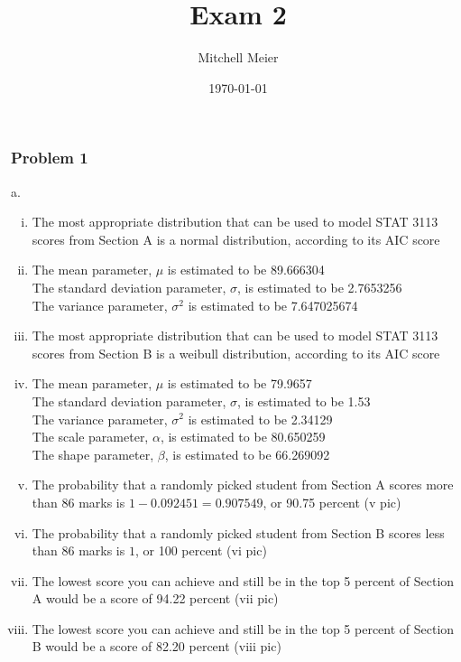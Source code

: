 \documentclass[14pt]{article}
\title{Exam 2}
\author{Mitchell Meier}
\date{\today}
\begin{document}
\maketitle

\subsubsection*{Problem 1}

a.
\begin{enumerate}[(i)]

\item
The most appropriate distribution that can be used to model STAT 3113 scores from Section A is a normal distribution, according to its AIC score

\item
The mean parameter, $\mu$ is estimated to be 89.666304 \\
The standard deviation parameter, $\sigma$, is estimated to be 2.7653256 \\
The variance parameter, $\sigma^2$ is estimated to be 7.647025674 \\

\item
The most appropriate distribution that can be used to model STAT 3113 scores from Section B is a weibull distribution, according to its AIC score

\item
The mean parameter, $\mu$ is estimated to be 79.9657 \\
The standard deviation parameter, $\sigma$, is estimated to be 1.53 \\
The variance parameter, $\sigma^2$ is estimated to be 2.34129 \\
The scale parameter, $\alpha$, is estimated to be 80.650259 \\
The shape parameter, $\beta$, is estimated to be 66.269092 

\item
The probability that a randomly picked student from Section A scores more than 86 marks is $1 - 0.092451 = 0.907549$, or 90.75 percent (v pic)

\item
The probability that a randomly picked student from Section B scores less than 86 marks is $1$, or 100 percent (vi pic)

\item
The lowest score you can achieve and still be in the top 5 percent of Section A would be a score of 94.22 percent (vii pic)

\item
The lowest score you can achieve and still be in the top 5 percent of Section B would be a score of 82.20 percent (viii pic)

\end{enumerate}
\end{document}

